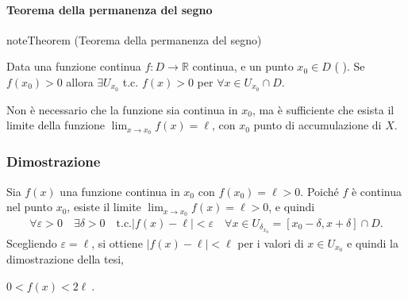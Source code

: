 \documentclass[letterpaper,10pt,italian]{jupyterBook}
\begin{document}
\sphinxAtStartPar
{} 


\paragraph{Teorema della permanenza del segno}
\label{\detokenize{ch/infinitesimal_calculus/analysis:teorema-della-permanenza-del-segno}}\label{\detokenize{ch/infinitesimal_calculus/analysis:infinitesimal-calculus-continuous-fun-thms-sign}}\label{None:thm:infinitesimal-calculus:continuous-fun:thms:sign}
\begin{sphinxadmonition}{note}{Theorem  (Teorema della permanenza del segno)}



\sphinxAtStartPar
Data una funzione continua \(f: D \rightarrow \mathbb{R}\) continua, e un punto \(x_0 \in D\) ( ). Se \(f(x_0) > 0\) allora \(\exists U_{x_0}\) t.c. \(f(x) > 0\) per \(\forall x \in U_{x_0} \cap D\).
\end{sphinxadmonition}

\sphinxAtStartPar
{} Non è necessario che la funzione sia continua in \(x_0\), ma è sufficiente che esista il limite della funzione \(\lim_{x \rightarrow x_0} f(x) = \ell\), con \(x_0\) punto di accumulazione di \(X\).
\subsubsection*{Dimostrazione}

\sphinxAtStartPar
Sia \(f(x)\) una funzione continua in \(x_0\) con \(f(x_0) = \ell > 0\). Poiché \(f\) è continua nel punto \(x_0\), esiste il limite \(\lim_{x \rightarrow x_0} f(x) = \ell > 0\), e quindi
\begin{equation*}
\begin{split}\forall \varepsilon > 0 \quad \exists \delta > 0 \quad \text{t.c.} |f(x) - \ell| < \varepsilon \quad \forall x \in U_{\delta_{x_0}} = [ x_0 - \delta, x + \delta] \cap D . \end{split}
\end{equation*}
\sphinxAtStartPar
Scegliendo \(\varepsilon = \ell\), si ottiene \(|f(x) - \ell| < \ell\) per i valori di \(x \in U_{x_0}\) e quindi la dimostrazione della tesi,

\sphinxAtStartPar
\(0 < f(x) < 2 \ell \ .\)
\end{document}
